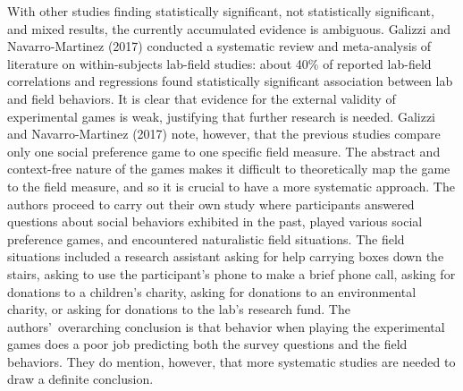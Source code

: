 \documentclass[12pt]{article}
\begin{document}
With other studies finding statistically significant, not statistically significant, and mixed results, the currently accumulated evidence is ambiguous. Galizzi and Navarro-Martinez (2017) conducted a systematic review and meta-analysis of literature on within-subjects lab-field studies: about 40\% of reported lab-field correlations and regressions found statistically significant association between lab and field behaviors. It is clear that evidence for the external validity of experimental games is weak, justifying that further research is needed. Galizzi and Navarro-Martinez (2017) note, however, that the previous studies compare only one social preference game to one specific field measure. The abstract and context-free nature of the games makes it difficult to theoretically map the game to the field measure, and so it is crucial to have a more systematic approach. The authors proceed to carry out their own study where participants answered questions about social behaviors exhibited in the past, played various social preference games, and encountered naturalistic field situations. The field situations included a research assistant asking for help carrying boxes down the stairs, asking to use the participant\rq s phone to make a brief phone call, asking for donations to a children\rq s charity, asking for donations to an environmental charity, or asking for donations to the lab\rq s research fund.  The authors\rq \ overarching conclusion is that behavior when playing the experimental games does a poor job predicting both the survey questions and the field behaviors. They do mention, however, that more systematic studies are needed to draw a definite conclusion.
\end{document}
